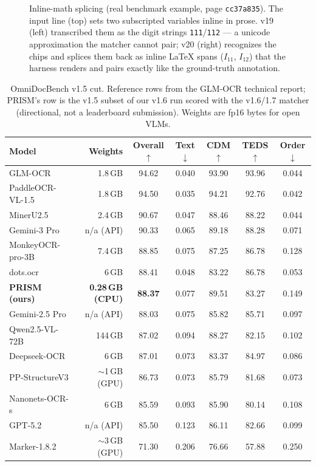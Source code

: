 \begin{figure}[t]
  \centering
  \resizebox{\linewidth}{!}{}
  \caption{Inline-math splicing (real benchmark example, page \texttt{cc37a835}). The input line (top) sets two subscripted variables inline in prose. v19 (left) transcribed them as the digit strings \texttt{111}/\texttt{112} --- a unicode approximation the matcher cannot pair; v20 (right) recognizes the chips and splices them back as inline \LaTeX{} spans ($I_{11}$, $I_{12}$) that the harness renders and pairs exactly like the ground-truth annotation.}
  \label{fig:splice}
\end{figure}

\begin{table}[t]
\centering
\caption{OmniDocBench v1.5 cut. Reference rows from the GLM-OCR technical report; PRISM's row is the v1.5 subset of our v1.6 run scored with the v1.6/1.7 matcher (directional, not a leaderboard submission). Weights are fp16 bytes for open VLMs.}
\label{tab:v15}
\small
\setlength{\tabcolsep}{3.5pt}
\begin{tabular}{lrccccc}
\toprule
Model & Weights & Overall$\uparrow$ & Text$\downarrow$ & CDM$\uparrow$ & TEDS$\uparrow$ & Order$\downarrow$ \\
\midrule
GLM-OCR & 1.8\,GB & 94.62 & 0.040 & 93.90 & 93.96 & 0.044 \\
PaddleOCR-VL-1.5 & 1.8\,GB & 94.50 & 0.035 & 94.21 & 92.76 & 0.042 \\
MinerU2.5 & 2.4\,GB & 90.67 & 0.047 & 88.46 & 88.22 & 0.044 \\
Gemini-3 Pro & n/a (API) & 90.33 & 0.065 & 89.18 & 88.28 & 0.071 \\
MonkeyOCR-pro-3B & 7.4\,GB & 88.85 & 0.075 & 87.25 & 86.78 & 0.128 \\
dots.ocr & 6\,GB & 88.41 & 0.048 & 83.22 & 86.78 & 0.053 \\
\textbf{PRISM (ours)} & \textbf{0.28\,GB (CPU)} & \textbf{88.37} & 0.077 & 89.51 & 83.27 & 0.149 \\
Gemini-2.5 Pro & n/a (API) & 88.03 & 0.075 & 85.82 & 85.71 & 0.097 \\
Qwen2.5-VL-72B & 144\,GB & 87.02 & 0.094 & 88.27 & 82.15 & 0.102 \\
Deepseek-OCR & 6\,GB & 87.01 & 0.073 & 83.37 & 84.97 & 0.086 \\
PP-StructureV3 & $\sim$1\,GB (GPU) & 86.73 & 0.073 & 85.79 & 81.68 & 0.073 \\
Nanonets-OCR-s & 6\,GB & 85.59 & 0.093 & 85.90 & 80.14 & 0.108 \\
GPT-5.2 & n/a (API) & 85.50 & 0.123 & 86.11 & 82.66 & 0.099 \\
Marker-1.8.2 & $\sim$3\,GB (GPU) & 71.30 & 0.206 & 76.66 & 57.88 & 0.250 \\
\bottomrule
\end{tabular}
\end{table}

